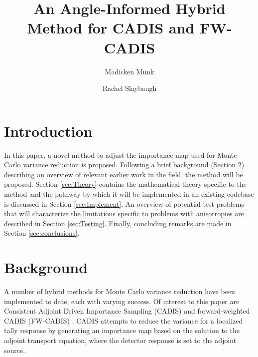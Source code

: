 \documentclass{mc2015}
\begin{document}
\title{An Angle-Informed Hybrid Method for CADIS and FW-CADIS}

\author{Madicken Munk}
\author{Rachel Slaybaugh}

\maketitle

\section{Introduction}

In this paper, a novel method to adjust the importance map used for Monte Carlo variance reduction is proposed. Following a brief background (Section \ref{sec:Background}) describing an overview of relevant earlier work in the field, the method will be proposed.  
Section \ref{sec:Theory} contains the mathematical theory specific to the method and the pathway by which it will be implemented in an existing codebase is discussed in Section \ref{sec:Implement}. 
An overview of potential test problems that will characterize the limitations specific to problems with anisotropies are described in Section \ref{sec:Testing}. 
Finally, concluding remarks are made in Section \ref{sec:conclusions}.  

\section{Background}
\label{sec:Background}

A number of hybrid methods for Monte Carlo variance reduction have been implemented to date, each with varying success. Of interest to this paper are Consistent Adjoint Driven Importance Sampling (CADIS) \cite{wagner_automatic_1997,wagner_automated_1998,haghighat_monte_2003} and forward-weighted CADIS (FW-CADIS) \cite{wagner_forward-weighted_2007,wagner_forward-weighted_2009,wagner_forward-weighted_2010}. CADIS attempts to reduce the variance for a localized tally response by generating an importance map based on the solution to the adjoint transport equation, where the detector response is set to the adjoint source. 
\end{document}

